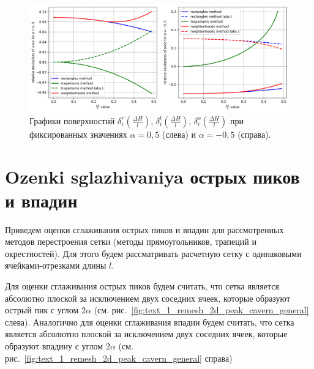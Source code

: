 \documentclass[
11pt,%
tightenlines,%
twoside,%
onecolumn,%
nofloats,%
nobibnotes,%
nofootinbib,%
superscriptaddress,%
noshowpacs,%
centertags]%
{revtex4}
\begin{document}
\begin{figure}[ht]
\setcaptionmargin{5mm}
\onelinecaptionsfalse %
\includegraphics[width=1.0\textwidth]{pics/remesh_fix_alfa_chart.png}
\caption{Графики поверхностнй $\delta_i^r(\frac{\Delta H}{l})$, $\delta_i^t(\frac{\Delta H}{l})$, $\delta_i^o(\frac{\Delta H}{l})$ при фиксированных значениях $\alpha = 0,5$ (слева) и $\alpha = -0,5$ (справа).}
\label{fig:text_1_remesh_fix_alfa_chart}
\end{figure}


\section{Ozenki sglazhivaniya острых пиков и впадин}

Приведем оценки сглаживания острых пиков и впадин для рассмотренных методов перестроения сетки (методы прямоугольников, трапеций и окрестностей).
Для этого будем рассматривать расчетную сетку с одинаковыми ячейками-отрезками длины $l$.

Для оценки сглаживания острых пиков будем считать, что сетка является абсолютно плоской за исключением двух соседних ячеек, которые образуют острый пик с углом $2 \alpha$ (см. рис.~\ref{fig:text_1_remesh_2d_peak_cavern_general} слева).
Аналогично для оценки сглаживания впадин будем считать, что сетка является абсолютно плоской за исключением двух соседних ячеек, которые образуют впадину с углом $2 \alpha$ (см. рис.~\ref{fig:text_1_remesh_2d_peak_cavern_general} справа)
\end{document}
